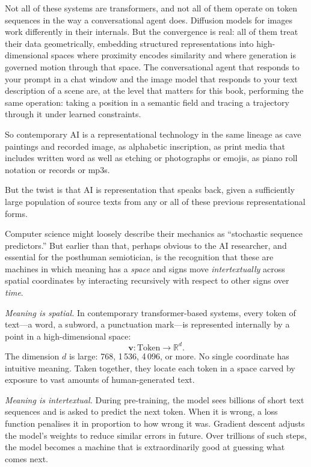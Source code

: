 Not all of these systems are transformers, and not all of them operate on token sequences in the way a conversational agent does. Diffusion models for images work differently in their internals. But the convergence is real: all of them treat their data geometrically, embedding structured representations into high-dimensional spaces where proximity encodes similarity and where generation is governed motion through that space. The conversational agent that responds to your prompt in a chat window and the image model that responds to your text description of a scene are, at the level that matters for this book, performing the same operation: taking a position in a semantic field and tracing a trajectory through it under learned constraints.

So contemporary AI is a representational technology in the same lineage as cave paintings and recorded image, as alphabetic inscription, as print media that includes written word as well as etching or photographs or emojis, as piano roll notation or records or mp3s.

But the twist is that AI is representation that speaks back, given a sufficiently large population of source texts from any or all of these previous representational forms.

Computer science might loosely describe their mechanics as ``stochastic sequence predictors.'' But earlier than that, perhaps obvious to the AI researcher, and essential for the posthuman semiotician, is the recognition that these are machines in which meaning has a \textit{space} and signs move \textit{intertextually} across spatial coordinates by interacting recursively with respect to other signs over \textit{time}.

\textit{Meaning is spatial.} In contemporary transformer-based systems, every token of text---a word, a subword, a punctuation mark---is represented internally by a point in a high-dimensional space:
\[
\mathbf{v} : \text{Token} \rightarrow \mathbb{R}^{d}.
\]
The dimension $d$ is large: 768, 1\,536, 4\,096, or more. No single coordinate has intuitive meaning. Taken together, they locate each token in a space carved by exposure to vast amounts of human-generated text.

\textit{Meaning is intertextual.} During pre-training, the model sees billions of short text sequences and is asked to predict the next token. When it is wrong, a loss function penalises it in proportion to how wrong it was. Gradient descent adjusts the model's weights to reduce similar errors in future. Over trillions of such steps, the model becomes a machine that is extraordinarily good at guessing what comes next.

